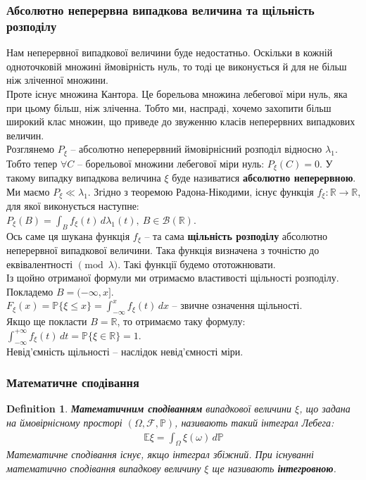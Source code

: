 \documentclass[a4paper, 10pt]{article}
\theoremstyle{theoremdd}
\newtheorem{definition}[theorem]{Definition}
\begin{document}
\subsubsection*{Абсолютно неперервна випадкова величина та щільність розподілу}
Нам неперервної випадкової величини буде недостатньо. Оскільки в кожній одноточковій множині ймовірність нуль, то тоді це виконується й для не більш ніж зліченної множини.\\
Проте існує множина Кантора. Це борельова множина лебегової міри нуль, яка при цьому більш, ніж зліченна. Тобто ми, наспраді, хочемо захопити більш широкий клас множин, що приведе до звуженню класів неперервних випадкових величин.\\
Розглянемо $P_{\xi}$ -- абсолютно неперервний ймовірнісний розподіл відносно $\lambda_1$. Тобто тепер $\forall C$ -- борельової множини лебегової міри нуль: $P_{\xi}(C) = 0$. У такому випадку випадкова величина $\xi$ буде називатися \textbf{абсолютно неперервною}. \\
Ми маємо $P_\xi \ll \lambda_1$. Згідно з теоремою Радона-Нікодими, існує функція $f_\xi \colon \mathbb{R} \to \mathbb{R}$, для якої виконується наступне:\\
$P_\xi(B) = \displaystyle\int_B f_\xi(t)\,d\lambda_1(t),\ B \in \mathcal{B}(\mathbb{R})$.\\
Ось саме ця шукана функція $f_\xi$ -- та сама \textbf{щільність розподілу} абсолютно неперервної випадкової величини. Така функція визначена з точністю до еквівалентності $\pmod \lambda$. Такі функції будемо ототожнювати.\\
Із щойно отриманої формули ми отримаємо властивості щільності розподілу. Покладемо $B = (-\infty,x]$.\\
$F_\xi(x) = \mathbb{P}\{\xi \leq x\} = \displaystyle\int_{-\infty}^x f_\xi(t)\,dx$ -- звичне означення щільності.\\
Якщо ще покласти $B = \mathbb{R}$, то отримаємо таку формулу:\\
$\displaystyle\int_{-\infty}^{+\infty} f_\xi(t)\,dt = \mathbb{P}\{\xi \in \mathbb{R}\} = 1$.\\
Невід'ємність щільності -- наслідок невід'ємності міри.

\subsubsection*{Математичне сподівання}
\begin{definition}
\textbf{Математичним сподіванням} випадкової величини $\xi$, що задана на ймовірнісному просторі $(\Omega,\mathcal{F},\mathbb{P})$, називають такий інтеграл Лебега:
\begin{align*}
\mathbb{E} \xi = \int_\Omega \xi(\omega)\,d\mathbb{P}
\end{align*}
Математичне сподівання існує, якщо інтеграл збіжний. При існуванні математично сподівання випадкову величину $\xi$ ще називають \textbf{інтегровною}.
\end{definition}
\end{document}
